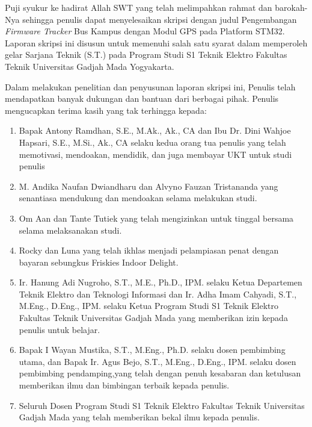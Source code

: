 Puji syukur ke hadirat Allah SWT yang telah melimpahkan rahmat dan barokah-Nya sehingga penulis dapat menyelesaikan skripsi dengan judul Pengembangan \textit{Firmware Tracker} Bus Kampus dengan Modul GPS pada Platform STM32. Laporan skripsi ini disusun untuk memenuhi salah satu syarat dalam memperoleh gelar Sarjana Teknik (S.T.) pada Program Studi S1 Teknik Elektro Fakultas Teknik Universitas Gadjah Mada Yogyakarta.


Dalam melakukan penelitian dan penyusunan laporan skripsi ini, Penulis telah mendapatkan banyak dukungan dan bantuan dari berbagai pihak. Penulis mengucapkan terima kasih yang tak terhingga kepada:

\begin{enumerate}
	\item Bapak Antony Ramdhan, S.E., M.Ak., Ak., CA dan Ibu Dr. Dini Wahjoe Hapsari, S.E., M.Si., Ak., CA selaku kedua orang tua penulis yang telah memotivasi, mendoakan, mendidik, dan juga membayar UKT untuk studi penulis
	
	\item M. Andika Naufan Dwiandharu dan Alvyno Fauzan Tristananda yang senantiasa mendukung dan mendoakan selama melakukan studi.
	
	\item Om Aan dan Tante Tutiek yang telah mengizinkan untuk tinggal bersama selama melaksanakan studi.
	
	\item Rocky dan Luna yang telah ikhlas menjadi pelampiasan penat dengan bayaran sebungkus Friskies Indoor Delight.
	
	\item Ir. Hanung Adi Nugroho, S.T., M.E., Ph.D., IPM. selaku Ketua Departemen Teknik Elektro dan Teknologi Informasi dan Ir. Adha Imam Cahyadi, S.T., M.Eng., D.Eng., IPM. selaku Ketua Program Studi S1 Teknik Elektro Fakultas Teknik Universitas Gadjah Mada yang memberikan izin kepada penulis untuk belajar.
		
	\item Bapak I Wayan Mustika, S.T., M.Eng., Ph.D. selaku dosen pembimbing utama, dan Bapak Ir. Agus Bejo, S.T., M.Eng., D.Eng., IPM. selaku dosen pembimbing pendamping,yang telah dengan penuh kesabaran dan ketulusan memberikan ilmu dan bimbingan terbaik kepada penulis.
	
	\item Seluruh Dosen Program Studi S1 Teknik Elektro Fakultas Teknik Universitas Gadjah Mada yang telah memberikan bekal ilmu kepada penulis.
	

\end{enumerate}
